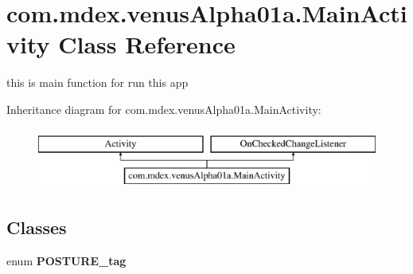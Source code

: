 \hypertarget{classcom_1_1mdex_1_1venus_alpha01a_1_1_main_activity}{}\section{com.\+mdex.\+venus\+Alpha01a.\+Main\+Activity Class Reference}
\label{classcom_1_1mdex_1_1venus_alpha01a_1_1_main_activity}


this is main function for run this app  


Inheritance diagram for com.\+mdex.\+venus\+Alpha01a.\+Main\+Activity\+:\begin{figure}[H]
\begin{center}
\leavevmode
\includegraphics[height=2.000000cm]{classcom_1_1mdex_1_1venus_alpha01a_1_1_main_activity}
\end{center}
\end{figure}
\subsection*{Classes}
\begin{DoxyCompactItemize}
\item 
enum {\bfseries P\+O\+S\+T\+U\+R\+E\+\_\+tag}
\end{DoxyCompactItemize}

